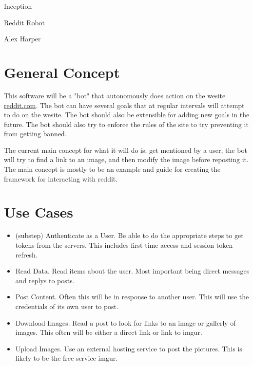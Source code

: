 \documentclass[12pt]{article}
\begin{document}
\begin{titlepage}
	\centering
	{\Huge Inception\par}
	\vspace{0.25in}
	{\Large Reddit Robot\par}
	\vspace{2in}
	{Alex Harper\par}
	\newpage
\end{titlepage}
\tableofcontents
\newpage

\section{General Concept}

This software will be a "bot" that autonomously does action on the wesite \href{http://reddit.com}{reddit.com}.
The bot can have several goals that at regular intervals will attempt to do on the wesite.
The bot should also be extensible for adding new goals in the future.
The bot should also try to enforce the rules of the site to try preventing it from getting banned.

The current main concept for what it will do is; get mentioned by a user, the bot will try to find a link to an image, and then modify the image before reposting it.
The main concept is mostly to be an example and guide for creating the framework for interacting with reddit.

\section{Use Cases}

\begin{itemize}
\item (substep) Authenticate as a User.
Be able to do the appropriate steps to get tokens from the servers.
This includes first time access and session token refresh.

\item Read Data.
Read items about the user.
Most important being direct messages and replys to posts.

\item Post Content.
Often this will be in response to another user.
This will use the credentials of its own user to post.

\item Download Images.
Read a post to look for links to an image or gallerly of images.
This often will be either a direct link or link to imgur.

\item Upload Images.
Use an external hosting service to post the pictures.
This is likely to be the free service imgur.
\end{itemize}
\end{document}
